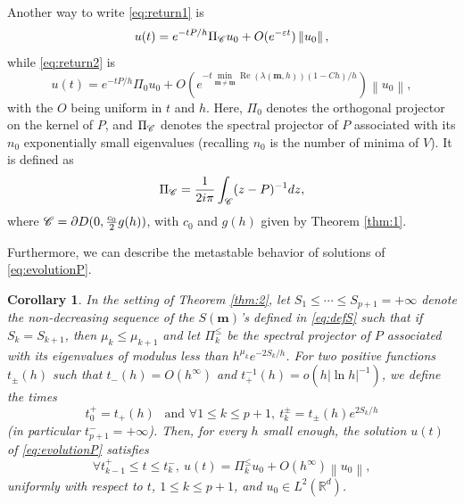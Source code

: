 \documentclass[12pt]{amsart}
\renewcommand{\Re}{\operatorname{Re}}
\newcommand{\R}{\mathbb R}
\numberwithin{equation}{section}
\numberwithin{figure}{section}
\def\m{\mathbf{m}}
\def\um{\underline{\m}}
\newcommand{\vvert}[1]{\left\lVert#1\right\rVert}
\newtheorem{corollary}[defin]{Corollary}
\begin{document}
Another %
way to write \eqref{eq:return1} is
\begin{equation*}
u(t) = e^{-tP/h}\Pi_\Cr u_0 + O(e^{-\varepsilon t})\vvert{u_0},
\end{equation*}
while \eqref{eq:return2} is
\begin{equation*}
u(t) = e^{-tP/h}\Pi_0 u_0 + O(e^{-t\underset{\m\neq\um}{\min}\Re(\lambda(\m,h))(1-Ch)/h})\vvert{u_0},
\end{equation*}
with the $O$ being uniform in $t$ and $h$. Here, $\Pi_0$ denotes the orthogonal projector on the kernel of $P$, and $\Pi_{\mathscr C}$ denotes the spectral projector of $P$ associated with its $n_0$ exponentially small eigenvalues (recalling $n_0$ is the number of minima of $V$). It is defined %
as
\begin{equation*}
\Pi_{\mathscr C} = \frac{1}{2i\pi}\int_{{\mathscr C}}(z-P)^{-1}dz,
\end{equation*}
where ${\mathscr C} = \partial D(0,\frac{c_0}2g(h))$, with $c_0$ and $g(h)$ given by Theorem \ref{thm:1}.

Furthermore, %
we can describe the metastable behavior of solutions of \eqref{eq:evolutionP}.

\begin{corollary}\label{cor:times}
    In the setting of Theorem \ref{thm:2}, let $S_1\leq\cdots\leq S_{p+1}=+\infty$ denote the non-decreasing sequence of the $S(\m)$'s defined in \eqref{eq:defS} such that if $S_k = S_{k+1}$, then $\mu_k \leq \mu_{k+1}$ and let $\Pi^\leq_k$ be the spectral projector of $P$ associated with its eigenvalues of modulus less than $h^{\mu_k}e^{-2S_k/h}$. For two positive functions $t_\pm(h)$ such that $t_-(h) = O(h^\infty)$ and $t_+^{-1}(h) = o(h|\ln h|^{-1})$, we define the %
times
    \begin{equation*}
    t_0^+ = t_+(h)\ \ \text{ and }\forall1\leq k\leq p+1,\ t^\pm_k = t_\pm(h)e^{2S_k/h}
    \end{equation*}
    (in particular $t^-_{p+1} = +\infty$). Then, for every $h$ small enough, the solution $u(t)$ of \eqref{eq:evolutionP} satisfies
    \begin{equation*}
    \forall t^+_{k-1}\leq t\leq t^-_k,\ u(t) = \Pi^\leq_ku_0 + O(h^\infty)\vvert{u_0},
    \end{equation*}
    uniformly %
with respect to $t$, $1\leq k\leq p+1$, and $u_0\in L^2(\R^d)$.
\end{corollary}
\end{document}
